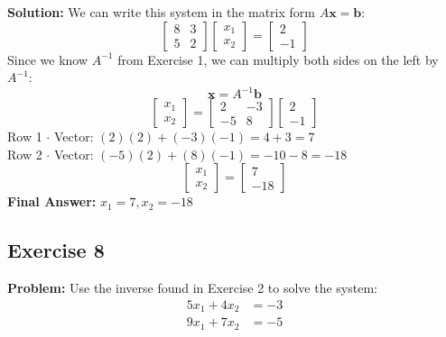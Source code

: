 \documentclass[11pt]{article}
\begin{document}
\textbf{Solution:}
We can write this system in the matrix form $A\mathbf{x} = \mathbf{b}$:
\[ \begin{bmatrix} 8 & 3 \\ 5 & 2 \end{bmatrix} \begin{bmatrix} x_1 \\ x_2 \end{bmatrix} = \begin{bmatrix} 2 \\ -1 \end{bmatrix} \]
Since we know $A^{-1}$ from Exercise 1, we can multiply both sides on the left by $A^{-1}$:
\[ \mathbf{x} = A^{-1} \mathbf{b} \]
\[ \begin{bmatrix} x_1 \\ x_2 \end{bmatrix} = \begin{bmatrix} 2 & -3 \\ -5 & 8 \end{bmatrix} \begin{bmatrix} 2 \\ -1 \end{bmatrix} \]
Row 1 $\cdot$ Vector: $(2)(2) + (-3)(-1) = 4 + 3 = 7$ \\
Row 2 $\cdot$ Vector: $(-5)(2) + (8)(-1) = -10 - 8 = -18$
\[ \begin{bmatrix} x_1 \\ x_2 \end{bmatrix} = \begin{bmatrix} 7 \\ -18 \end{bmatrix} \]
\textbf{Final Answer:} $x_1 = 7, x_2 = -18$

\subsection{Exercise 8}
\textbf{Problem:} Use the inverse found in Exercise 2 to solve the system:
\begin{align*}
    5x_1 + 4x_2 &= -3 \\
    9x_1 + 7x_2 &= -5
\end{align*}
\end{document}
